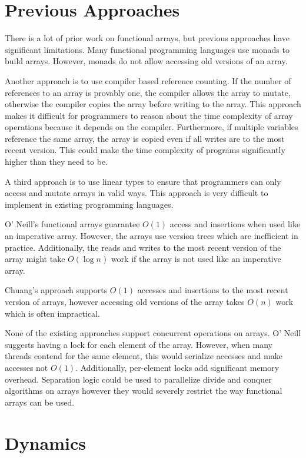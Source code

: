 \documentclass[preprint]{sigplanconf}
\begin{document}
\section{Previous Approaches}

There is a lot of prior work on functional arrays, but previous approaches have significant limitations. Many functional programming languages use monads to build arrays. However, monads do not allow accessing old versions of an array.

Another approach is to use compiler based reference counting. If the number of references to an array is provably one, the compiler allows the array to mutate, otherwise the compiler copies the array before writing to the array. This approach makes it difficult for programmers to reason about the time complexity of array operations because it depends on the compiler. Furthermore, if multiple variables reference the same array, the array is copied even if all writes are to the most recent version. This could make the time complexity of programs significantly higher than they need to be.

A third approach is to use linear types to ensure that programmers can only access and mutate arrays in valid ways. This approach is very difficult to implement in existing programming languages.

O' Neill's functional arrays guarantee $O(1)$ access and insertions when used like an imperative array. However, the arrays use version trees which are inefficient in practice. Additionally, the reads and writes to the most recent version of the array might take $O(\log{n})$ work if the array is not used like an imperative array.

Chuang's approach supports $O(1)$ accesses and insertions to the most recent version of arrays, however accessing old versions of the array takes $O(n)$ work which is often impractical.

None of the existing approaches support concurrent operations on arrays. O' Neill suggests having a lock for each element of the array. However, when many threads contend for the same element, this would serialize accesses and make accesses not $O(1)$. Additionally, per-element locks add significant memory overhead. Separation logic could be used to parallelize divide and conquer algorithms on arrays however they would severely restrict the way functional arrays can be used.

\section{Dynamics}
\end{document}
